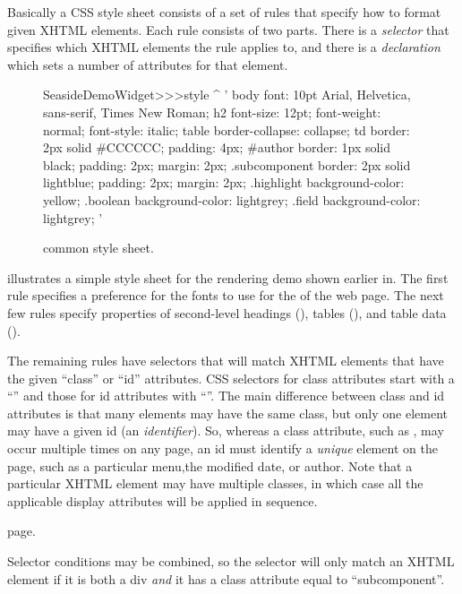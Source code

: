 \documentclass[a4paper,10pt,twoside]{book}
\begin{document}
Basically a CSS style sheet consists of a set of rules that specify how to format given
XHTML elements.
Each rule consists of two parts.
There is a \emph{selector} that specifies which XHTML elements the rule applies to, and
there is a \emph{declaration} which sets a number of attributes for that element.

\begin{figure}[tb]
\begin{code}{}
SeasideDemoWidget>>>style
	^ '
body {
	font: 10pt Arial, Helvetica, sans-serif, Times New Roman;
}
h2 {
	font-size: 12pt;
	font-weight: normal;
	font-style: italic;
}
table { border-collapse: collapse; }
td {
	border: 2px solid #CCCCCC;
	padding: 4px;
}
#author {
	border: 1px solid black;
	padding: 2px;
	margin: 2px;
}
.subcomponent {
	border: 2px solid lightblue;
	padding: 2px;
	margin: 2px;
}
.highlight { background-color: yellow; }
.boolean { background-color: lightgrey; }
.field { background-color: lightgrey; }
'
\end{code}
\caption{ common style sheet.
}
\end{figure}
 illustrates a simple style sheet for the rendering demo shown earlier in.
The first rule specifies a preference for the fonts to use for the  of the web
page.
The next few rules specify properties of second-level headings (), tables
(), and table data ().

The remaining rules have selectors that will match XHTML elements that have the given
``class'' or ``id'' attributes.
CSS selectors for class attributes start with a ``'' and those for id attributes
with ``\ct{#}''.
The main difference between class and id attributes is that many elements may have the
same class, but only one element may have a given id (\ie an \emph{identifier}).
So, whereas a class attribute, such as , may occur multiple times on any
page, an id must identify a \emph{unique} element on the page, such as a particular menu,the modified date, or author.
Note that a particular XHTML element may have multiple classes, in which case all the
applicable display attributes will be applied in sequence.

page.

Selector conditions may be combined, so the selector  will only
match an XHTML element if it is both a div \emph{and} it has a class attribute equal to
``subcomponent''.
\end{document}
